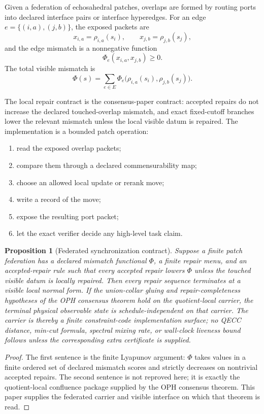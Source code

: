 \documentclass[11pt]{article}
\newtheorem{proposition}[theorem]{Proposition}
\theoremstyle{remark}
\theoremstyle{plain}
\begin{document}
Given a federation of echosahedral patches, overlaps are formed by routing ports into declared
interface pairs or interface hyperedges. For an edge \(e=\{(i,a),(j,b)\}\), the exposed packets
are
\[
x_{i,a}=\rho_{i,a}(s_i),\qquad x_{j,b}=\rho_{j,b}(s_j),
\]
and the edge mismatch is a nonnegative function
\[
\Phi_e(x_{i,a},x_{j,b})\ge 0.
\]
The total visible mismatch is
\[
\Phi(s)=\sum_{e\in E}\Phi_e\bigl(\rho_{i,a}(s_i),\rho_{j,b}(s_j)\bigr).
\]

The local repair contract is the consensus-paper contract: accepted repairs do not increase the
declared touched-overlap mismatch, and exact fixed-cutoff branches lower the relevant mismatch
unless the local visible datum is repaired. The implementation is a bounded patch operation:
\begin{enumerate}[leftmargin=2em]
\item read the exposed overlap packets;
\item compare them through a declared commensurability map;
\item choose an allowed local update or rerank move;
\item write a record of the move;
\item expose the resulting port packet;
\item let the exact verifier decide any high-level task claim.
\end{enumerate}

\begin{proposition}[Federated synchronization contract]
Suppose a finite patch federation has a declared mismatch functional \(\Phi\), a finite repair
menu, and an accepted-repair rule such that every accepted repair lowers \(\Phi\) unless the
touched visible datum is locally repaired. Then every repair sequence terminates at a visible
local normal form. If the union-collar gluing and repair-completeness hypotheses of the OPH
consensus theorem hold on the quotient-local carrier, the terminal physical observable state is
schedule-independent on that carrier. The carrier is thereby a finite constraint-code
implementation surface; no QECC distance, min-cut formula, spectral mixing rate, or wall-clock
liveness bound follows unless the corresponding extra certificate is supplied.
\end{proposition}

\begin{proof}
The first sentence is the finite Lyapunov argument: \(\Phi\) takes values in a finite ordered set
of declared mismatch scores and strictly decreases on nontrivial accepted repairs. The second
sentence is not reproved here; it is exactly the quotient-local confluence package supplied by the
OPH consensus theorem. This paper supplies the federated carrier and visible interface on which
that theorem is read.
\end{proof}
\end{document}
